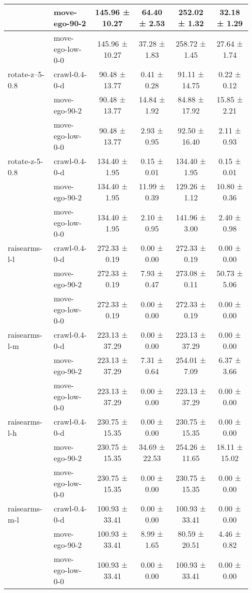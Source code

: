 \begin{tabular}{|l|l|c|c|c|c|}
\hline
 & move-ego-90-2 & 145.96 ± 10.27 & 64.40 ± 2.53 & 252.02 ± 1.32 & 32.18 ± 1.29 \\
\hline
 & move-ego-low-0-0 & 145.96 ± 10.27 & 37.28 ± 1.83 & 258.72 ± 1.45 & 27.64 ± 1.74 \\
\hline
rotate-z--5-0.8 & crawl-0.4-0-d & 90.48 ± 13.77 & 0.41 ± 0.28 & 91.11 ± 14.75 & 0.22 ± 0.12 \\
\hline
 & move-ego-90-2 & 90.48 ± 13.77 & 14.84 ± 1.92 & 84.88 ± 17.92 & 15.85 ± 2.21 \\
\hline
 & move-ego-low-0-0 & 90.48 ± 13.77 & 2.93 ± 0.95 & 92.50 ± 16.40 & 2.11 ± 0.93 \\
\hline
rotate-z-5-0.8 & crawl-0.4-0-d & 134.40 ± 1.95 & 0.15 ± 0.01 & 134.40 ± 1.95 & 0.15 ± 0.01 \\
\hline
 & move-ego-90-2 & 134.40 ± 1.95 & 11.99 ± 0.39 & 129.26 ± 1.12 & 10.80 ± 0.36 \\
\hline
 & move-ego-low-0-0 & 134.40 ± 1.95 & 2.10 ± 0.95 & 141.96 ± 3.00 & 2.40 ± 0.98 \\
\hline
raisearms-l-l & crawl-0.4-0-d & 272.33 ± 0.19 & 0.00 ± 0.00 & 272.33 ± 0.19 & 0.00 ± 0.00 \\
\hline
 & move-ego-90-2 & 272.33 ± 0.19 & 7.93 ± 0.47 & 273.08 ± 0.11 & 50.73 ± 5.06 \\
\hline
 & move-ego-low-0-0 & 272.33 ± 0.19 & 0.00 ± 0.00 & 272.33 ± 0.19 & 0.00 ± 0.00 \\
\hline
raisearms-l-m & crawl-0.4-0-d & 223.13 ± 37.29 & 0.00 ± 0.00 & 223.13 ± 37.29 & 0.00 ± 0.00 \\
\hline
 & move-ego-90-2 & 223.13 ± 37.29 & 7.31 ± 0.64 & 254.01 ± 7.09 & 6.37 ± 3.66 \\
\hline
 & move-ego-low-0-0 & 223.13 ± 37.29 & 0.00 ± 0.00 & 223.13 ± 37.29 & 0.00 ± 0.00 \\
\hline
raisearms-l-h & crawl-0.4-0-d & 230.75 ± 15.35 & 0.00 ± 0.00 & 230.75 ± 15.35 & 0.00 ± 0.00 \\
\hline
 & move-ego-90-2 & 230.75 ± 15.35 & 34.69 ± 22.53 & 254.26 ± 11.65 & 18.11 ± 15.02 \\
\hline
 & move-ego-low-0-0 & 230.75 ± 15.35 & 0.00 ± 0.00 & 230.75 ± 15.35 & 0.00 ± 0.00 \\
\hline
raisearms-m-l & crawl-0.4-0-d & 100.93 ± 33.41 & 0.00 ± 0.00 & 100.93 ± 33.41 & 0.00 ± 0.00 \\
\hline
 & move-ego-90-2 & 100.93 ± 33.41 & 8.99 ± 1.65 & 80.59 ± 20.51 & 4.46 ± 0.82 \\
\hline
 & move-ego-low-0-0 & 100.93 ± 33.41 & 0.00 ± 0.00 & 100.93 ± 33.41 & 0.00 ± 0.00 \\

\end{tabular}
